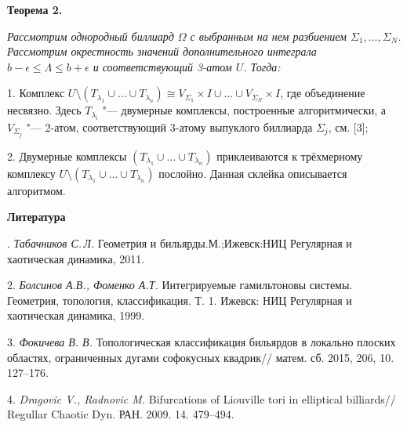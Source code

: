 \textbf{Теорема 2.} {\it
	Рассмотрим однородный биллиард $\Omega$ с выб\-ран\-ным на нем разбиением $\Sigma_1, \ldots, \Sigma_N$. Рассмотрим окрест\-ность значений дополнительного интеграла $b - \epsilon \leq \Lambda \leq b + \epsilon$ и соответствующий 3-атом $U$. Тогда:

1. Комплекс $U \setminus (T_{\lambda_1}\cup\ldots\cup T_{\lambda_n}) \cong V_{\Sigma_1} \times I \cup \ldots \cup V_{\Sigma_N} \times I$, где объединение несвязно. Здесь $T_{\lambda_i}$ "--- двумерные комплексы, построенные алгорит\-мически, а $V_{\Sigma_j}$ "--- 2-атом, соот\-вет\-ствующий 3-атому выпуклого бил\-лиарда $\Sigma_j$, см. [3];

2. Двумерные комплексы $(T_{\lambda_1} \cup \ldots \cup T_{\lambda_n})$ приклеиваются к трёхмерному комплексу $U \setminus (T_{\lambda_1} \cup \ldots \cup T_{\lambda_n})$ послойно. Данная склейка описывается алгоритмом.}







\smallskip \centerline {\bf Литература} . {\it Табачников С.\,Л.}
Геометрия и бильярды.М.;Ижевск:НИЦ Регулярная и хаотическая динамика, 2011.

2. {\it Болсинов А.В., Фоменко А.Т.}
Интегрируемые гамиль\-тоновы системы. Геометрия, топология, классификация. Т. 1. Ижевск: НИЦ Регулярная и хаотическая динамика, 1999.

3. {\it Фокичева В. В.}
Топологическая классификация бильярдов в локально плоских областях, ограниченных дугами софокусных квадрик//
матем. сб. 2015, 206, 10. 127--176.

4. {\it Dragovic V., Radnovic M.}
Bifurcations of Liouville tori in elliptical billiards//
Regullar Chaotic Dyn. РАН. 2009. 14. 479--494.
